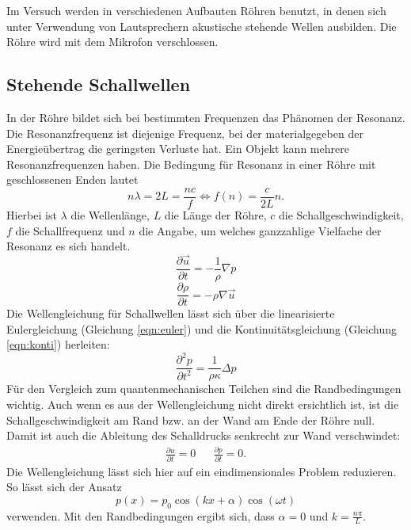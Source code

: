 Im Versuch werden in verschiedenen Aufbauten Röhren benutzt, in denen sich unter Verwendung von Lautsprechern akustische stehende Wellen ausbilden.
Die Röhre wird mit dem Mikrofon verschlossen.\\
%
\subsection{Stehende Schallwellen}
In der Röhre bildet sich bei bestimmten Frequenzen das Phänomen der Resonanz.
Die Resonanzfrequenz ist diejenige Frequenz, bei der materialgegeben der Energieübertrag die geringsten Verluste hat.
Ein Objekt kann mehrere Resonanzfrequenzen haben.
Die Bedingung für Resonanz in einer Röhre mit geschlossenen Enden lautet
\begin{equation}
  n \lambda = 2 L = \frac{n c}{f} \Leftrightarrow f(n) = \frac{c}{2L} n.
  \label{eqn:resonanz}
\end{equation}
Hierbei ist $\lambda$ die Wellenlänge, $L$ die Länge der Röhre, $c$ die Schallgeschwindigkeit, $f$ die Schallfrequenz und $n$ die Angabe, um welches ganzzahlige Vielfache der Resonanz es sich handelt.\\
%
\begin{equation}
  \frac{ \partial \vec{u}}{ \partial t} = - \frac{1}{\rho} \nabla p
  \label{eqn:euler}
\end{equation}
\begin{equation}
  \frac{\partial \rho}{ \partial t} = - \rho \nabla \vec{u}
  \label{eqn:konti}
\end{equation}
%
Die Wellengleichung für Schallwellen lässt sich über die linearisierte Eulergleichung (Gleichung \eqref{eqn:euler}) und die Kontinuitätsgleichung (Gleichung \eqref{eqn:konti}) herleiten:
\begin{equation}
  \frac{ \partial^2 p}{\partial t^2} = \frac{1}{\rho \kappa} \Delta p
  \label{eqn:schallwelle}
\end{equation}
Für den Vergleich zum quantenmechanischen Teilchen sind die Randbedingungen wichtig.
Auch wenn es aus der Wellengleichung nicht direkt ersichtlich ist, ist die Schallgeschwindigkeit am Rand bzw. an der Wand am Ende der Röhre null.
Damit ist auch die Ableitung des Schalldrucks senkrecht zur Wand verschwindet:
\begin{align*}
  \frac{ \partial u }{\partial t} = 0 && \frac{ \partial p }{ \partial t} = 0.
\end{align*}
Die Wellengleichung lässt sich hier auf ein eindimensionales Problem reduzieren.
So lässt sich der Ansatz
\begin{equation*}
  p(x)=p_{0} \cos{(kx + \alpha)} \cos{(\omega t)}
\end{equation*}
verwenden.
Mit den Randbedingungen ergibt sich, dass $\alpha=0$ und $k= \frac{n \pi}{L}$.
%
%
